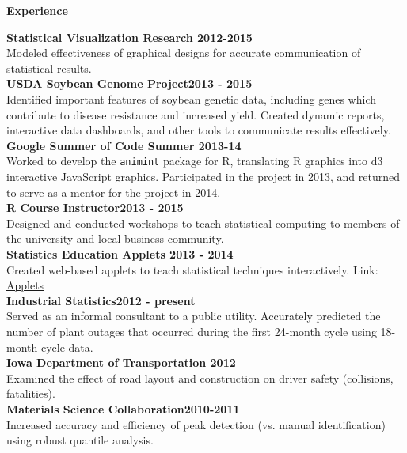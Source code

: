 \documentclass[letterpaper,12pt,final]{memoir}
\newcommand{\SmallSep}{\vspace{0.5em}}
\newcommand{\CVSection}[1]
	{\Large\textbf{#1}\par
	\SmallSep\normalsize\normalfont}
\newcommand{\CVItem}[1]
	{\textbf{\color{RoyalBlue} #1}}
\begin{document}
\CVSection{Experience}
\begin{multicols}{2}
\CVItem{Statistical Visualization Research \hfill 2012-2015}\\
{\small Modeled effectiveness of graphical designs for accurate communication of statistical results. \SmallSep\\}
\CVItem{USDA Soybean Genome Project\hfill 2013 - 2015}\\
{\small Identified important features of soybean genetic data, including genes which contribute to disease resistance and increased yield. Created dynamic reports, interactive data dashboards, and other tools to communicate results effectively. \SmallSep\\}
\CVItem{Google Summer of Code \hfill Summer 2013-14}\\
{\small Worked to develop the \texttt{animint} package for R, translating R graphics into d3 interactive JavaScript graphics. Participated in the project in 2013, and returned to serve as a mentor for the project in 2014. \SmallSep\\}
\CVItem{R Course Instructor\hfill 2013 - 2015}\\
{\small Designed and conducted workshops to teach statistical computing to members of the university and local business community. \SmallSep\\}
\CVItem{Statistics Education Applets \hfill 2013 - 2014}\\
{\small Created web-based applets to teach statistical techniques interactively. Link: \href{http://vanderplas.dyndns-remote.com:3838/}{Applets} \SmallSep\\}
\CVItem{Industrial Statistics\hfill 2012 - present}\\
{\small Served as an informal consultant to a public utility. Accurately predicted the number of plant outages that occurred during the first 24-month cycle using 18-month cycle data. 
\SmallSep\\}
\CVItem{Iowa Department of Transportation \hfill 2012}\\
{\small Examined the effect of road layout and construction on driver safety (collisions, fatalities).\SmallSep\\}
\CVItem{Materials Science Collaboration\hfill 2010-2011}\\
{\small Increased accuracy and efficiency of peak detection (vs. manual identification) using robust quantile analysis. 
\SmallSep\\}
\end{multicols}
\end{document}
